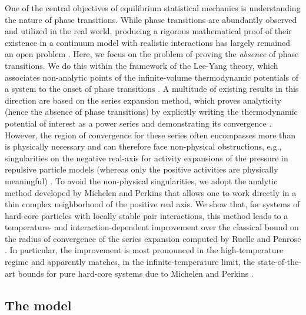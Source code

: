 \documentclass[11pt]{article}
\numberwithin{equation}{section}
\theoremstyle{plain}
\theoremstyle{definition}
\theoremstyle{remark}
\begin{document}
One of the central objectives of equilibrium statistical mechanics is understanding the nature of phase transitions.
While phase transitions are abundantly observed and utilized in the real world, producing a rigorous mathematical proof of their existence in a continuum model with realistic interactions has largely remained an open problem \cite{lebowitz1999liquid,lewin2015crystallization,widom1970new}.
Here, we focus on the problem of proving the \emph{absence} of phase transitions.
We do this within the framework of the Lee-Yang theory, which associates non-analytic points of the infinite-volume thermodynamic potentials of a system to the onset of phase transitions \cite{yang1952statistical}.
A multitude of existing results in this direction are based on the series expansion method, which proves analyticity (hence the absence of phase transitions) by explicitly writing the thermodynamic potential of interest as a power series and demonstrating its convergence \cite{fernandez2007analyticity,mayer1941molecular,penrose1963convergence,procacci2017convergence,ruelle1963correlation}.
However, the region of convergence for these series often encompasses more than is physically necessary and can therefore face non-physical obstructions, e.g., singularities on the negative real-axis for activity expansions of the pressure in repulsive particle models (whereas only the positive activities are physically meaningful) \cite{achlioptas2021lov,groeneveld1962two}.
To avoid the non-physical singularities, we adopt the analytic method developed by Michelen and Perkins  \cite{michelen2021potential,michelen2023analyticity} that allows one to work directly in a thin complex neighborhood of the positive real axis.
We show that, for systems of hard-core particles with locally stable pair interactions, this method leads to a temperature- and interaction-dependent improvement over the classical bound on the radius of convergence of the series expansion computed by Ruelle \cite{ruelle1963correlation} and Penrose \cite{penrose1963convergence}.
In particular, the improvement is most pronounced in the high-temperature regime and apparently matches, in the infinite-temperature limit, the state-of-the-art bounds for pure hard-core systems due to Michelen and Perkins \cite{michelen2021potential,michelen2023analyticity}.



\subsection{The model}
\label{sec:introduction_model}
\end{document}
